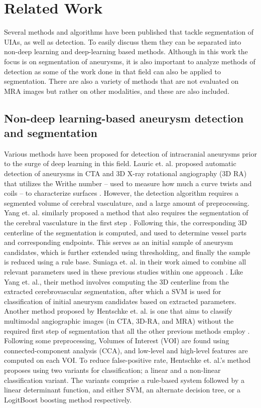 \chapter{Related Work}


Several methods and algorithms have been published that tackle segmentation of UIAs, as well as detection. To easily discuss them they can be separated into non-deep learning and deep-learning based methods. Although in this work the focus is on segmentation of aneurysms, it is also important to analyze methods of detection as some of the work done in that field can also be applied to segmentation. There are also a variety of methods that are not evaluated on MRA images but rather on other modalities, and these are also included.

\section{Non-deep learning-based aneurysm detection and segmentation}
Various methods have been proposed for detection of intracranial aneurysms prior to the surge of deep learning in this field. Lauric et. al. proposed automatic detection of aneurysms in CTA and 3D X-ray rotational angiography (3D RA) that utilizes the Writhe number -- used to measure how much a curve twists and coils -- to characterize surfaces \cite{Lauric2010}. However, the detection algorithm requires a segmented volume of cerebral vasculature, and a large amount of preprocessing. Yang et. al. similarly proposed a method that also requires the segmentation of the cerebral vasculature in the first step \cite{Yang2011}. Following this, the corresponding 3D centerline of the segmentation is computed, and used to determine vessel parts and corresponding endpoints. This serves as an initial sample of aneurysm candidates, which is further extended using thresholding, and finally the sample is reduced using a rule base.  Suniaga et. al. in their work aimed to combine all relevant parameters used in these previous studies within one approach \cite{Suniaga2012}. Like Yang et. al., their method involves computing the 3D centerline from the extracted cerebrovascular segmentation, after which a SVM is used for classification of initial aneurysm candidates based on extracted parameters. Another method proposed by Hentschke et. al. is one that aims to classify multimodal angiographic images (in CTA, 3D-RA, and MRA) without the required first step of segmentation that all the other previous methods employ \cite{Hentschke2014}. Following some preprocessing, Volumes of Interest (VOI) are found using connected-component analysis (CCA), and low-level and high-level features are computed on each VOI. To reduce false-positive rate, Hentschke et. al.'s method proposes using two variants for classification; a linear and a non-linear classification variant. The variants comprise a rule-based system followed by a linear determinant function, and either SVM, an alternate decision tree, or a LogitBoost boosting method respectively. 

